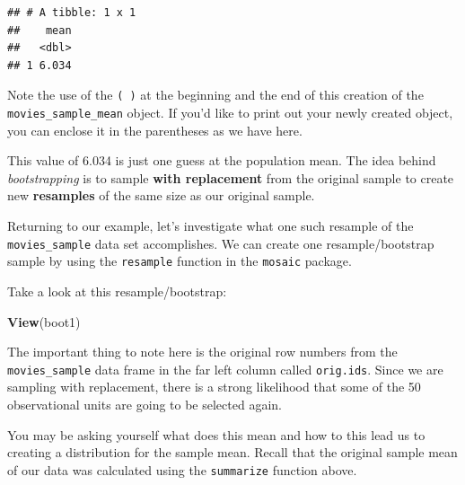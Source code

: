 \documentclass[]{tufte-book}
\newenvironment{Shaded}{\begin{snugshade}}{\end{snugshade}}
\newcommand{\KeywordTok}[1]{\textcolor[rgb]{0.13,0.29,0.53}{\textbf{{#1}}}}
\newcommand{\DataTypeTok}[1]{\textcolor[rgb]{0.13,0.29,0.53}{{#1}}}
\newcommand{\StringTok}[1]{\textcolor[rgb]{0.31,0.60,0.02}{{#1}}}
\newcommand{\OtherTok}[1]{\textcolor[rgb]{0.56,0.35,0.01}{{#1}}}
\newcommand{\NormalTok}[1]{{#1}}
\begin{document}
\begin{verbatim}
## # A tibble: 1 x 1
##    mean
##   <dbl>
## 1 6.034
\end{verbatim}

Note the use of the \texttt{(\ )} at the beginning and the end of this
creation of the \texttt{movies\_sample\_mean} object. If you'd like to
print out your newly created object, you can enclose it in the
parentheses as we have here.

This value of 6.034 is just one guess at the population mean. The idea
behind \emph{bootstrapping} is to sample \textbf{with replacement} from
the original sample to create new \textbf{resamples} of the same size as
our original sample.

Returning to our example, let's investigate what one such resample of
the \texttt{movies\_sample} data set accomplishes. We can create one
resample/bootstrap sample by using the \texttt{resample} function in the
\texttt{mosaic} package.

\begin{Shaded}
\end{Shaded}

Take a look at this resample/bootstrap:

\begin{Shaded}
\begin{Highlighting}[]
\KeywordTok{View}\NormalTok{(boot1)}
\end{Highlighting}
\end{Shaded}

The important thing to note here is the original row numbers from the
\texttt{movies\_sample} data frame in the far left column called
\texttt{orig.ids}. Since we are sampling with replacement, there is a
strong likelihood that some of the 50 observational units are going to
be selected again.

You may be asking yourself what does this mean and how to this lead us
to creating a distribution for the sample mean. Recall that the original
sample mean of our data was calculated using the \texttt{summarize}
function above.
\end{document}
